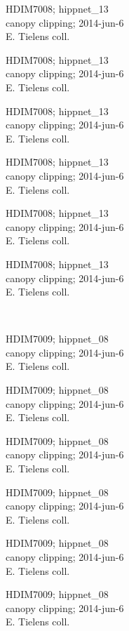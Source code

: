 \documentclass[2pt]{extarticle}
\begin{document}
\noindent
\parbox{0.16\textwidth}{\tiny \raggedright \rule[-0.3\baselineskip]{0pt}{10pt}HDIM7008; hippnet\_13\\ canopy clipping; 2014-jun-6\\ E. Tielens coll.}
\parbox{0.16\textwidth}{\tiny \raggedright \rule[-0.3\baselineskip]{0pt}{10pt}HDIM7008; hippnet\_13\\ canopy clipping; 2014-jun-6\\ E. Tielens coll.}
\parbox{0.16\textwidth}{\tiny \raggedright \rule[-0.3\baselineskip]{0pt}{10pt}HDIM7008; hippnet\_13\\ canopy clipping; 2014-jun-6\\ E. Tielens coll.}
\parbox{0.16\textwidth}{\tiny \raggedright \rule[-0.3\baselineskip]{0pt}{10pt}HDIM7008; hippnet\_13\\ canopy clipping; 2014-jun-6\\ E. Tielens coll.}
\parbox{0.16\textwidth}{\tiny \raggedright \rule[-0.3\baselineskip]{0pt}{10pt}HDIM7008; hippnet\_13\\ canopy clipping; 2014-jun-6\\ E. Tielens coll.}
\parbox{0.16\textwidth}{\tiny \raggedright \rule[-0.3\baselineskip]{0pt}{10pt}HDIM7008; hippnet\_13\\ canopy clipping; 2014-jun-6\\ E. Tielens coll.} \\ 
\vspace{0.001in} 

\noindent
\parbox{0.16\textwidth}{\tiny \raggedright \rule[-0.3\baselineskip]{0pt}{10pt}HDIM7009; hippnet\_08\\ canopy clipping; 2014-jun-6\\ E. Tielens coll.}
\parbox{0.16\textwidth}{\tiny \raggedright \rule[-0.3\baselineskip]{0pt}{10pt}HDIM7009; hippnet\_08\\ canopy clipping; 2014-jun-6\\ E. Tielens coll.}
\parbox{0.16\textwidth}{\tiny \raggedright \rule[-0.3\baselineskip]{0pt}{10pt}HDIM7009; hippnet\_08\\ canopy clipping; 2014-jun-6\\ E. Tielens coll.}
\parbox{0.16\textwidth}{\tiny \raggedright \rule[-0.3\baselineskip]{0pt}{10pt}HDIM7009; hippnet\_08\\ canopy clipping; 2014-jun-6\\ E. Tielens coll.}
\parbox{0.16\textwidth}{\tiny \raggedright \rule[-0.3\baselineskip]{0pt}{10pt}HDIM7009; hippnet\_08\\ canopy clipping; 2014-jun-6\\ E. Tielens coll.}
\parbox{0.16\textwidth}{\tiny \raggedright \rule[-0.3\baselineskip]{0pt}{10pt}HDIM7009; hippnet\_08\\ canopy clipping; 2014-jun-6\\ E. Tielens coll.} \\ 
\vspace{0.001in} 
\end{document}
